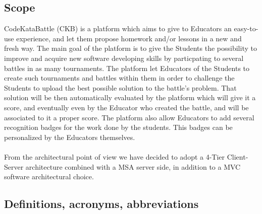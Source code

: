 \documentclass{article}
\begin{document}
\subsection{Scope}
CodeKataBattle (CKB) is a platform which aims to give to Educators an easy-to-use experience, and let
them propose homework and/or lessons in a new and fresh way.
The main goal of the platform is to give the Students the possibility to improve and acquire new software
developing skills by particpating to several battles in as many tournaments.
The platform let Educators of the Students to create such tournaments and battles within them
in order to challenge the Students to upload the best possible solution to the battle's
problem. That solution will be then automatically evaluated by the platform which will give it a score,
and eventually even by the Educator who created the battle, and will be associated to it a proper score.
The platform also allow Educators to add several recognition badges for the work done by the students.
This badges can be personalized by the Educators themselves.
\\ \\
From the architectural point of view we have decided to adopt a 4-Tier Client-Server architecture combined
with a MSA server side, in addition to a MVC software architectural choice.
\subsection{Definitions, acronyms, abbreviations}
\end{document}

